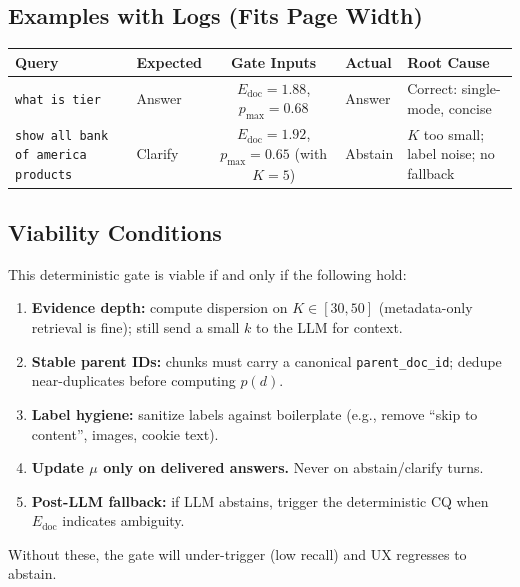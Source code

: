 \documentclass[11pt]{article}
\begin{document}
\subsection{Examples with Logs (Fits Page Width)}
\begin{table}[h]
\centering
\small
\begin{tabularx}{\textwidth}{@{}Y Y c Y Y@{}}
\toprule
\textbf{Query} & \textbf{Expected} & \textbf{Gate Inputs} & \textbf{Actual} & \textbf{Root Cause} \\
\midrule
\texttt{what is tier} & Answer & $E_{\text{doc}}{=}1.88$, $p_{\max}{=}0.68$ & Answer & Correct: single-mode, concise \\
\texttt{show all bank of america products} & Clarify & $E_{\text{doc}}{=}1.92$, $p_{\max}{=}0.65$ (with $K{=}5$) & Abstain & $K$ too small; label noise; no fallback \\
\bottomrule
\end{tabularx}
\end{table}

\subsection{Viability Conditions}
This deterministic gate is viable if and only if the following hold:
\begin{enumerate}[leftmargin=1.25em]
  \item \textbf{Evidence depth:} compute dispersion on $K\in[30,50]$ (metadata-only retrieval is fine); still send a small $k$ to the LLM for context.
  \item \textbf{Stable parent IDs:} chunks must carry a canonical \texttt{parent\_doc\_id}; dedupe near-duplicates before computing $p(d)$.
  \item \textbf{Label hygiene:} sanitize labels against boilerplate (e.g., remove ``skip to content'', images, cookie text).
  \item \textbf{Update $\mu$ only on delivered answers.} Never on abstain/clarify turns.
  \item \textbf{Post-LLM fallback:} if LLM abstains, trigger the deterministic CQ when $E_{\text{doc}}$ indicates ambiguity.
\end{enumerate}
Without these, the gate will under-trigger (low recall) and UX regresses to abstain.
\end{document}
